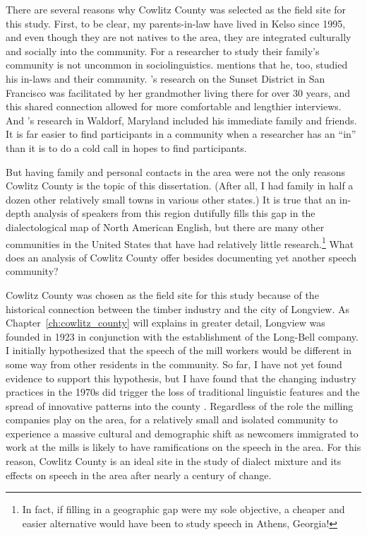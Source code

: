 There are several reasons why Cowlitz County was selected as the field site for this study. First, to be clear, my parents-in-law have lived in Kelso since 1995, and even though they are not natives to the area, they are integrated culturally and socially into the community. For a researcher to study their family’s community is not uncommon in sociolinguistics. \citet{hazen_2000_pads} mentions that he, too, studied his in-laws and their community. \citeauthor{hall_lew_2009_diss}'s \citeyearpar{hall_lew_2009_diss} research on the Sunset District in San Francisco was facilitated by her grandmother living there for over 30 years, and this shared connection allowed for more comfortable and lengthier interviews. And \citeauthor{bowie_2000_diss}'s \citeyearpar[41]{bowie_2000_diss} research in Waldorf, Maryland included his immediate family and friends. It is far easier to find participants in a community when a researcher has an “in” than it is to do a cold call in hopes to find participants.

But having family and personal contacts in the area were not the only reasons Cowlitz County is the topic of this dissertation. (After all, I had family in half a dozen other relatively small towns in various other states.)
It is true that an in-depth analysis of speakers from this region dutifully fills this gap in the dialectological map of North American English, but there are many other communities in the United States that have had relatively little research.\footnote{In fact, if filling in a geographic gap were my sole objective, a cheaper and easier alternative would have been to study speech in Athens, Georgia!} What does an analysis of Cowlitz County offer besides documenting yet another speech community?

Cowlitz County was chosen as the field site for this study because of the historical connection between the timber industry and the city of Longview. As Chapter~\ref{ch:cowlitz_county} will explains in greater detail, Longview was founded in 1923 in conjunction with the establishment of the Long-Bell company. I initially hypothesized that the speech of the mill workers would be different in some way from other residents in the community. So far, I have not yet found evidence to support this hypothesis, but I have found that the changing industry practices in the 1970s did trigger the loss of traditional linguistic features and the spread of innovative patterns into the county \citep{stanley_2018_pwpl}. Regardless of the role the milling companies play on the area, for a relatively small and isolated community to experience a massive cultural and demographic shift as newcomers immigrated to work at the mills is likely to have ramifications on the speech in the area. For this reason, Cowlitz County is an ideal site in the study of dialect mixture and its effects on speech in the area after nearly a century of change.

